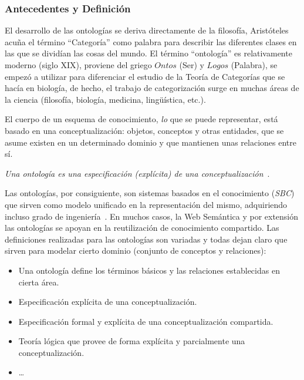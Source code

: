 \subsubsection{Antecedentes y Definición}
El desarrollo de las ontologías se deriva directamente de la filosofía, 
Aristóteles acuña el término ``Categoría'' como palabra para describir las
diferentes clases en las que se dividían las cosas del mundo. 
El término ``ontología'' es relativamente moderno (siglo XIX), proviene del griego
$Ontos$ (Ser) y $Logos$ (Palabra), se empezó a utilizar para diferenciar el
estudio de la Teoría de Categorías que se hacía en biología, de hecho, el trabajo de categorización surge en muchas áreas de la
ciencia (filosofía, biología, medicina, lingüística, etc.).

El cuerpo de un esquema de conocimiento, \textit{lo} que se puede representar, está basado en una
conceptualización: objetos, conceptos y otras entidades, que se asume existen en
un determinado dominio y que mantienen unas relaciones entre sí. 

\begin{Frame}
\textit{Una ontología es una especificación (explícita) de una conceptualización}~\cite{GruberOnto}. 
\end{Frame}

Las ontologías, por consiguiente, son sistemas basados en el conocimiento (\textit{\gls{SBC}}) que
sirven como modelo unificado en la representación del mismo, adquiriendo incluso
grado de ingeniería~\cite{isbn1846283965,Benjamins98ontological}. En muchos
casos, la Web Semántica y por extensión las ontologías se apoyan en la
reutilización de conocimiento compartido. Las definiciones realizadas para las ontologías son variadas y todas dejan claro
que sirven para modelar cierto dominio (conjunto de conceptos y relaciones):

\begin{itemize}
  \item Una ontología define los términos básicos y las relaciones establecidas en cierta área.
  \item Especificación explícita de una conceptualización.
  \item Especificación formal y explícita de una conceptualización compartida.
  \item Teoría lógica que provee de forma explícita y parcialmente una conceptualización.
  \item \ldots
\end{itemize}

